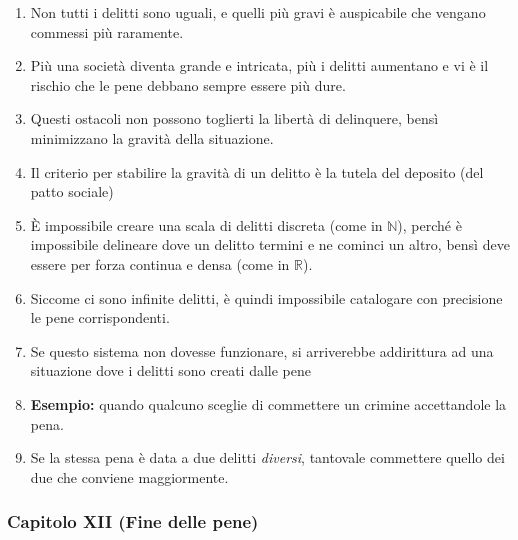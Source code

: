 \documentclass{article}
\begin{document}
\begin{enumerate}
    \item Non tutti i delitti sono uguali, e quelli più gravi è auspicabile che vengano commessi più raramente.
    \item Più una società diventa grande e intricata, più i delitti aumentano e vi è il rischio che le pene debbano sempre essere più dure.
    \item Questi ostacoli non possono toglierti la libertà di delinquere, bensì minimizzano
    la gravità della situazione.
    \item Il criterio per stabilire la gravità di un delitto è la tutela del deposito (del patto sociale)
    \item È impossibile creare una scala di delitti discreta (come in \(\mathbb{N}\)), perché è impossibile delineare dove
    un delitto termini e ne cominci un altro, bensì deve essere per forza continua e densa (come in \(\mathbb{R}\)).
    \item Siccome ci sono infinite delitti, è quindi impossibile catalogare con precisione le pene corrispondenti.
    \item Se questo sistema non dovesse funzionare, si arriverebbe addirittura ad una situazione dove i delitti
    sono creati dalle pene
    \item \textbf{Esempio:} quando qualcuno sceglie di commettere un crimine accettandole la pena.
    \item Se la stessa pena è data a due delitti \textit{diversi}, tantovale commettere quello dei due che conviene maggiormente.
\end{enumerate}

\newpage
\subsubsection{Capitolo XII (Fine delle pene)}
\end{document}
